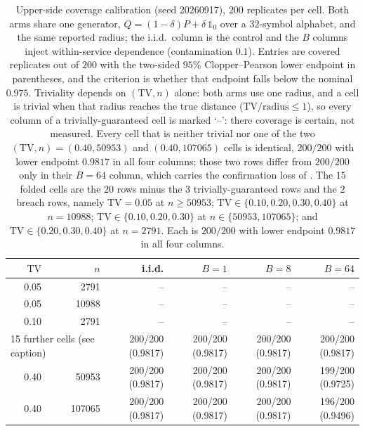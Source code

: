 \documentclass[sigconf,anonymous,review]{acmart}
\begin{document}
\begin{table}[t]
\centering
\small
\caption{Upper-side coverage calibration (seed 20260917), $200$ replicates per cell. Both arms share one generator, $Q=(1-\delta)P+\delta\,\mathbb{1}_{0}$ over a $32$-symbol alphabet, and the same reported radius; the i.i.d.\ column is the control and the $B$ columns inject within-service dependence (contamination $0.1$). Entries are covered replicates out of $200$ with the two-sided $95\%$ Clopper--Pearson lower endpoint in parentheses, and the criterion is whether that endpoint falls below the nominal $0.975$. Triviality depends on $(\mathrm{TV}, n)$ alone: both arms use one radius, and a cell is trivial when that radius reaches the true distance ($\mathrm{TV}/\mathrm{radius}\le 1$), so every column of a trivially-guaranteed cell is marked `--': there coverage is certain, not measured. Every cell that is neither trivial nor one of the two $(\mathrm{TV},n)=(0.40,50953)$ and $(0.40,107065)$ cells is identical, $200/200$ with lower endpoint $0.9817$ in all four columns; those two rows differ from $200/200$ only in their $B{=}64$ column, which carries the confirmation loss of . The $15$ folded cells are the $20$ rows minus the $3$ trivially-guaranteed rows and the $2$ breach rows, namely $\mathrm{TV}=0.05$ at $n\ge 50953$; $\mathrm{TV}\in\{0.10,0.20,0.30,0.40\}$ at $n=10988$; $\mathrm{TV}\in\{0.10,0.20,0.30\}$ at $n\in\{50953,107065\}$; and $\mathrm{TV}\in\{0.20,0.30,0.40\}$ at $n=2791$. Each is $200/200$ with lower endpoint $0.9817$ in all four columns.}
\label{tab:coverage}
\begin{tabular}{rrrrrr}
\toprule
$\mathrm{TV}$ & $n$ & i.i.d. & $B{=}1$ & $B{=}8$ & $B{=}64$ \\
\midrule
0.05 & 2791 & -- & -- & -- & -- \\
0.05 & 10988 & -- & -- & -- & -- \\
0.10 & 2791 & -- & -- & -- & -- \\
\midrule
\multicolumn{2}{l}{15 further cells (see caption)} & 200/200 (0.9817) & 200/200 (0.9817) & 200/200 (0.9817) & 200/200 (0.9817) \\
\midrule
0.40 & 50953 & 200/200 (0.9817) & 200/200 (0.9817) & 200/200 (0.9817) & 199/200 (0.9725) \\
0.40 & 107065 & 200/200 (0.9817) & 200/200 (0.9817) & 200/200 (0.9817) & 196/200 (0.9496) \\
\bottomrule
\end{tabular}
\end{table}
\end{document}
